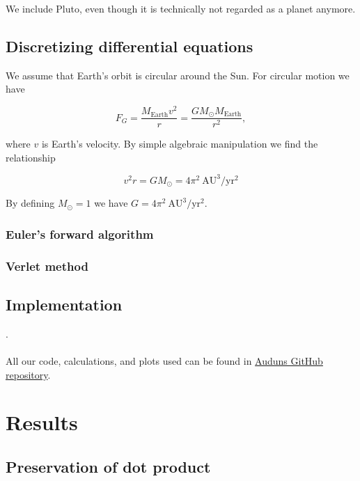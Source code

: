 \documentclass[a4paper, fontsize=11pt]{article}
\begin{document}
We include Pluto, even though it is technically not regarded as a planet anymore. 

\subsection{Discretizing differential equations}
We assume that Earth's orbit is circular around the Sun. For circular motion we have

\begin{equation}
F_{G} = \dfrac{M_{\text{Earth}}v^2}{r}=\dfrac{GM_{\odot} M_{\text{Earth}}}{r^2},
\end{equation}

where $v$ is Earth's velocity. By simple algebraic manipulation we find the relationship

\begin{equation}
v^2 r = G M_{\odot}=4 \pi^2 \: \text{AU}^3/\text{yr}^2
\end{equation}

By defining $M_{\odot} = 1$ we have $G=4\pi^2 \: \text{AU}^3/\text{yr}^2$.



\subsubsection{Euler's forward algorithm}



\subsubsection{Verlet method}


\subsection{Implementation}

.\cite{H-Jensen} 


\paragraph{}
All our code, calculations, and plots used can be found in \href{https://github.com/auduntre/FYS4150/tree/master/Project%203}{Auduns GitHub repository}.

\section{Results}
\subsection{Preservation of dot product}
\end{document}
